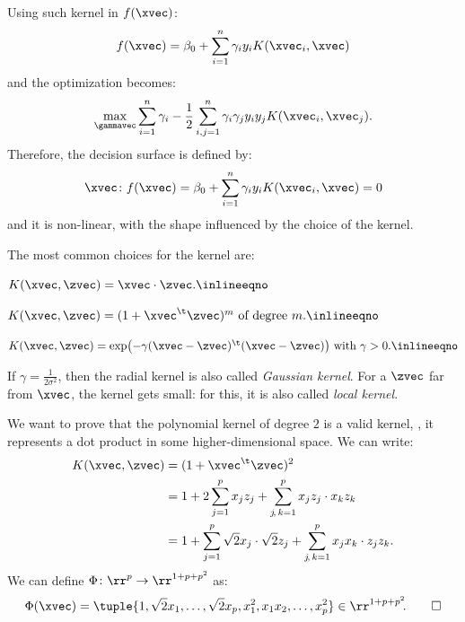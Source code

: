 Using such kernel in $f(\xvec)$:
\begin{equation}
    f(\xvec) = \beta_0 + \sum_{i = 1}^n \gamma_i y_i K(\xvec_i, \xvec)
\end{equation}
and the optimization becomes:
\begin{equation}
    \max_{\gammavec} \sum_{i = 1}^n \gamma_i - \frac{1}{2}\sum_{i,j = 1}^{n} \gamma_i\gamma_j y_i y_j K(\xvec_i, \xvec_j).
\end{equation}
Therefore, the decision surface is defined by:
\begin{equation}
    \xvec\colon f(\xvec) = \beta_0 + \sum_{i=1}^n \gamma_i y_i K(\xvec_i, \xvec) = 0
\end{equation}
and it is non-linear, with the shape influenced by the choice of the kernel.

The most common choices for the kernel are:
\begin{description}[beginpenalty=10000]
    \item[Linear Kernel] $\hfill K(\xvec, \zvec) = \xvec \cdot \zvec. \inlineeqno$
    \item[Polynomial Kernel] $\hfill K(\xvec, \zvec) = (1 + \xvec^\t\zvec)^m \text{ of degree } m. \hfill \inlineeqno$
    \item[Radial Kernel] $\hfill K(\xvec, \zvec) = \exp\bigl(- \gamma (\xvec - \zvec)^\t(\xvec - \zvec)\bigr) \text{ with } \gamma > 0. \hfill \inlineeqno$

          If $\gamma = \frac{1}{2\sigma^2}$, then the radial kernel is also called \emph{Gaussian kernel}. For a $\zvec$ far from $\xvec$, the kernel gets small: for this, it is also called \emph{local kernel}.
\end{description}

\begin{example}
    We want to prove that the polynomial kernel of degree $2$ is a valid kernel, \ie, it represents a dot product in some higher-dimensional space. We can write:
    \begin{equation}
        \begin{aligned}
            K(\xvec, \zvec) & = (1 + \xvec^\t\zvec)^2                                                                  \\
                            & = 1 + 2\sum_{j=1}^p x_j z_j + \sum_{j\negthinspace,\,k=1}^p x_jz_j\cdot x_k z_k                         \\
                            & = 1 + \sum_{j=1}^p \sqrt{2}x_j \cdot \sqrt{2}z_j + \sum_{j\negthinspace,\,k=1}^p x_j x_k \cdot z_j z_k.
        \end{aligned}
    \end{equation}
    We can define $\Phi\colon \rr^p \to \rr^{1+p+p^2}$ as:
    \begin{equation}
        \Phi(\xvec) = \tuple{1, \sqrt{2}x_1, \dots, \sqrt{2}x_p, x_1^2, x_1x_2,\ldots, x_p^2} \in \rr^{1+p+p^2}\negmedspace.\qedhere
    \end{equation}
\end{example}

